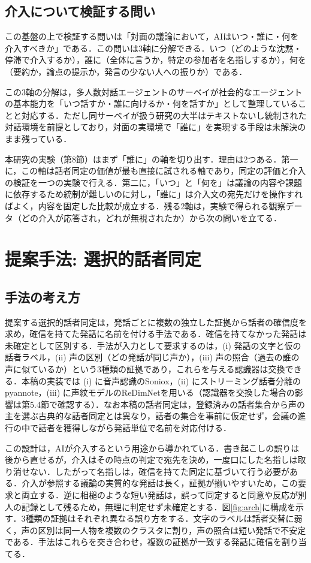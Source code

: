 \documentclass[a4paper]{ltjsarticle}
\begin{document}
\subsection{介入について検証する問い}
この基盤の上で検証する問いは「対面の議論において，AIはいつ・誰に・何を介入すべきか」である．この問いは3軸に分解できる．いつ（どのような沈黙・停滞で介入するか），誰に（全体に言うか，特定の参加者を名指しするか），何を（要約か，論点の提示か，発言の少ない人への振りか）である．

この3軸の分解は，多人数対話エージェントのサーベイ\cite{sapkota}が社会的なエージェントの基本能力を「いつ話すか・誰に向けるか・何を話すか」として整理していることと対応する．ただし同サーベイが扱う研究の大半はテキストないし統制された対話環境を前提としており，対面の実環境で「誰に」を実現する手段は未解決のまま残っている．

本研究の実験（第8節）はまず「誰に」の軸を切り出す．理由は2つある．第一に，この軸は話者同定の価値が最も直接に試される軸であり，同定の評価と介入の検証を一つの実験で行える．第二に，「いつ」と「何を」は議論の内容や課題に依存するため統制が難しいのに対し，「誰に」は介入文の宛先だけを操作すればよく，内容を固定した比較が成立する．残る2軸は，実験で得られる観察データ（どの介入が応答され，どれが無視されたか）から次の問いを立てる．

\section{提案手法: 選択的話者同定}
\subsection{手法の考え方}
提案する選択的話者同定は，発話ごとに複数の独立した証拠から話者の確信度を求め，確信を持てた発話に名前を付ける手法である．確信を持てなかった発話は未確定として区別する．手法が入力として要求するのは，(i) 発話の文字と仮の話者ラベル，(ii) 声の区別（どの発話が同じ声か），(iii) 声の照合（過去の誰の声に似ているか）という3種類の証拠であり，これらを与える認識器は交換できる．本稿の実装では (i) に音声認識のSoniox，(ii) にストリーミング話者分離のpyannote，(iii) に声紋モデルのReDimNet\cite{yakovlev}を用いる（認識器を交換した場合の影響は第5.4節で確認する）．なお本稿の話者同定は，登録済みの話者集合から声の主を選ぶ古典的な話者同定とは異なり，話者の集合を事前に仮定せず，会議の進行の中で話者を獲得しながら発話単位で名前を対応付ける．

この設計は，AIが介入するという用途から導かれている．書き起こしの誤りは後から直せるが，介入はその時点の判定で宛先を決め，一度口にした名指しは取り消せない．したがって名指しは，確信を持てた同定に基づいて行う必要がある．介入が参照する議論の実質的な発話は長く，証拠が揃いやすいため，この要求と両立する．逆に相槌のような短い発話は，誤って同定すると同意や反応が別人の記録として残るため，無理に判定せず未確定とする．図\ref{fig:arch}に構成を示す．3種類の証拠はそれぞれ異なる誤り方をする．文字のラベルは話者交替に弱く，声の区別は同一人物を複数のクラスタに割り，声の照合は短い発話で不安定である．手法はこれらを突き合わせ，複数の証拠が一致する発話に確信を割り当てる．
\end{document}
